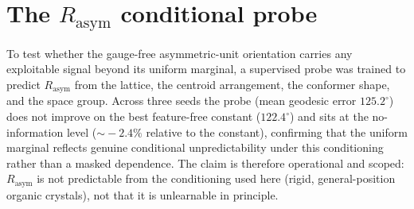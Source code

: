 \documentclass[journal=acsodf,manuscript=article]{achemso}
\begin{document}
\section{The $R_{\text{asym}}$ conditional probe}\label{sisec:probe}
To test whether the gauge-free asymmetric-unit orientation carries any exploitable
signal beyond its uniform marginal, a supervised probe was trained to predict
$R_{\text{asym}}$ from the lattice, the centroid arrangement, the conformer shape,
and the space group. Across three seeds the probe (mean geodesic error
$125.2^\circ$) does not improve on the best feature-free constant ($122.4^\circ$)
and sits at the no-information level ($\sim\!-2.4\%$ relative to the constant),
confirming that the uniform marginal reflects genuine conditional unpredictability
under this conditioning rather than a masked dependence. The claim is therefore
operational and scoped: $R_{\text{asym}}$ is not predictable from the conditioning
used here (rigid, general-position organic crystals), not that it is unlearnable in
principle.

\end{document}
